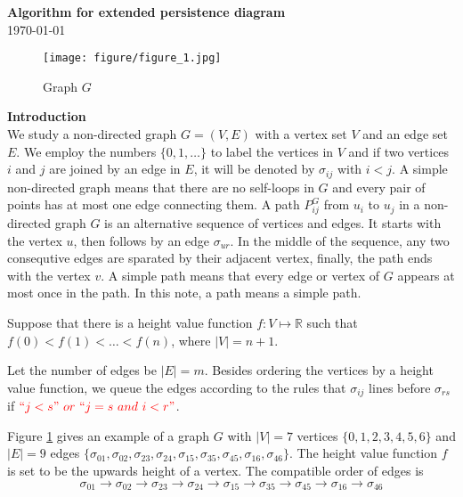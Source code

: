 \documentclass[a4paper,12pt]{article}
\title{}
\numberwithin{equation}{section}
\begin{document}
\begin{center}
  \textbf{\Large Algorithm for extended persistence diagram}\\
  \today
\end{center}

\noindent

	\begin{figure}[!hbtp]
		\centering				
		\texttt{[image: figure/figure\_1.jpg]}
		\caption{Graph $G$}
		\label{fig:graph_G}		
	\end{figure}
	
	\noindent
	\textbf{Introduction}\\
	
	We study a non-directed graph $G=(V,E)$ with a vertex set $V$ and an edge set $E$. We employ the numbers $\{0,1,\ldots\}$ to label the vertices in $V$ and if two vertices $i$ and $j$ are joined by an edge in $E$, it will be denoted by $\sigma_{ij}$ with $i<j$. A simple non-directed graph means that there are no self-loops in $G$ and every pair of points has at most one edge connecting them.  A path $P_{ij}^G$ from $u_i$ to $u_j$ in a non-directed graph $G$ is an alternative sequence of vertices and edges. It starts  with the vertex $u$, then follows by an edge $\sigma_{ur}$. In the middle of the sequence, any two consequtive edges are sparated by their adjacent vertex, finally, the path ends with the vertex $v$. A simple path means that every edge or vertex of $G$ appears at most once in the path. In this note, a path means a simple path. 
	
	Suppose that there is a height value function $f: V \mapsto \mathbb{R}$ such that $f(0) < f(1) < \ldots <f(n)$, where $\vert V \vert = n+1$. 
	
	Let the number of edges be $\vert E \vert =m$. Besides ordering the vertices by a height value function, we queue the edges according to the rules that $\sigma_{ij}$ lines before $\sigma_{rs}$ if $\color{red} ``j<s" \  or \  ``j=s \ and \ i<r"$.	
	
	Figure \ref{fig:graph_G} gives an example of a graph $G$ with $\vert V \vert =7$ vertices $\{0,1,2,3,4,5,6\}$ and $\vert E \vert =9$ edges $\{\sigma_{01}, \sigma_{02}, \sigma_{23}, \sigma_{24}, \sigma_{15}, \sigma_{35}, \sigma_{45}, \sigma_{16}, \sigma_{46} \}$. The height value function $f$ is set to be the upwards height of a vertex. The compatible order of edges is
	$$ \sigma_{01} \to \sigma_{02} \to \sigma_{23} \to \sigma_{24} \to \sigma_{15} \to \sigma_{35} \to \sigma_{45} \to \sigma_{16} \to \sigma_{46}$$\\
	
\end{document}
